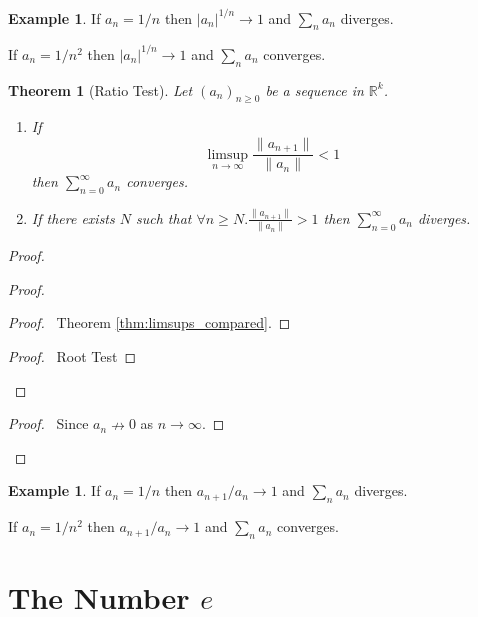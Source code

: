 \documentclass{book}
\let\qed\relax
\newtheorem{thm}[prop]{Theorem}
\theoremstyle{definition}
\newtheorem{ex}[prop]{Example}
\begin{document}
\begin{ex}
If $a_n = 1/n$ then $|a_n|^{1/n} \rightarrow 1$ and $\sum_n a_n$ diverges.

If $a_n = 1/n^2$ then $|a_n|^{1/n} \rightarrow 1$ and $\sum_n a_n$ converges.
\end{ex}

\begin{thm}[Ratio Test]
Let $(a_n)_{n \geq 0}$ be a sequence in $\mathbb{R}^k$.
\begin{enumerate}
\item If
\[ \limsup_{n \rightarrow \infty} \frac{\|a_{n+1}\|}{\|a_n\|} < 1 \]
then $\sum_{n=0}^\infty a_n$ converges.
\item If there exists $N$ such that $\forall n \geq N. \frac{\|a_{n+1}\|}{\|a_n\|} > 1$ then
$\sum_{n=0}^\infty a_n$ diverges.
\end{enumerate}
\end{thm}

\begin{proof}
\pf
{}
\begin{proof}
	\begin{proof}
		\pf\ Theorem \ref{thm:limsups_compared}.
	\end{proof}
	\begin{proof}
		\pf\ Root Test
	\end{proof}
\end{proof}
\begin{proof}
	\pf\ Since $a_n \nrightarrow 0$ as $n \rightarrow \infty$.
\end{proof}
\qed
\end{proof}

\begin{ex}
If $a_n = 1/n$ then $a_{n+1}/a_n \rightarrow 1$ and $\sum_n a_n$ diverges.

If $a_n = 1/n^2$ then $a_{n+1}/a_n \rightarrow 1$ and $\sum_n a_n$ converges.
\end{ex}

\section{The Number $e$}
\end{document}
